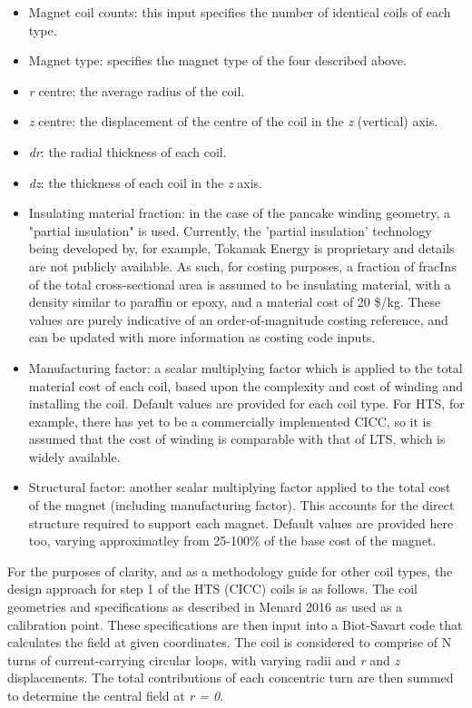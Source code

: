 \begin{itemize}
    \item Magnet coil counts: this input specifies the number of identical coils of each type.
    \item Magnet type: specifies the magnet type of the four described above.
    \item \textit{r} centre: the average radius of the coil.
    \item \textit{z} centre: the displacement of the centre of the coil in the \textit{z} (vertical) axis.
    \item \textit{dr}: the radial thickness of each coil.
    \item \textit{dz}: the thickness of each coil in the \textit{z} axis.
    \item Insulating material fraction: in the case of the pancake winding geometry, a "partial insulation" is used. Currently, the 'partial insulation' technology being developed by, for example, Tokamak Energy is proprietary and details are not publicly available. As such, for costing purposes, a fraction of fracIns of the total cross-sectional area is assumed to be insulating material, with a density similar to paraffin or epoxy, and a material cost of 20 \$/kg. These values are purely indicative of an order-of-magnitude costing reference, and can be updated with more information as costing code inputs.
    \item Manufacturing factor: a scalar multiplying factor which is applied to the total material cost of each coil, based upon the complexity and cost of winding and installing the coil. Default values are provided for each coil type. For HTS, for example, there has yet to be a commercially implemented CICC, so it is assumed that the cost of winding is comparable with that of LTS, which is widely available. 
    \item Structural factor: another scalar multiplying factor applied to the total cost of the magnet (including manufacturing factor). This accounts for the direct structure required to support each magnet. Default values are provided here too, varying approximatley from 25-100\% of the base cost of the magnet.
\end{itemize}

For the purposes of clarity, and as a methodology guide for other coil types, the design approach for step 1 of the HTS (CICC) coils is as follows. The coil geometries and specifications as described in Menard 2016 \cite{Menard2016} as used as a calibration point. These specifications are then input into a Biot-Savart code that calculates the field at given coordinates. The coil is considered to comprise of N turns of current-carrying circular loops, with varying radii and \textit{r} and \textit{z} displacements. The total contributions of each concentric turn are then summed to determine the central field at \textit{r = 0}.

